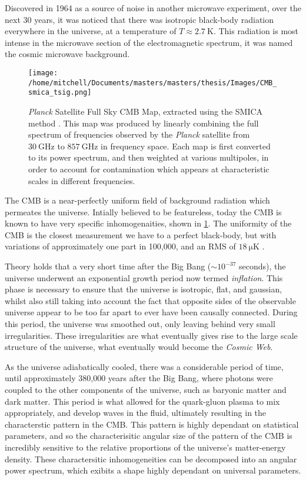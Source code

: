 \par Discovered in 1964 \citep{Penzias:65} as a source of noise in another microwave experiment, over the next 30 years, it was noticed that there was isotropic black-body radiation everywhere in the universe, at a temperature of $T \approx \SI{2.7}{\kelvin}$. This radiation is most intense in the microwave section of the electromagnetic spectrum, it was named the cosmic microwave background.
\begin{figure}[ht]
	\centering
	\texttt{[image: /home/mitchell/Documents/masters/masters/thesis/Images/CMB\_smica\_tsig.png]}
	\label{CMB Map}
	\caption{\emph{Planck} Satellite Full Sky CMB Map, extracted using the SMICA method \citep{2018arXiv180706205P}. This  map was produced by linearly combining the full spectrum of frequencies observed by the \emph{Planck} satellite from $\SI{30}{\giga\hertz}$ to $\SI{857}{\giga\hertz}$ in frequency space. Each map is first converted to its power spectrum, and then weighted at various multipoles, in order to account for contamination which appears at characteristic scales in different frequencies.}
\end{figure}

The CMB is a near-perfectly uniform field of background radiation which permeates the universe. Intially believed to be featureless, today the CMB is known to have very specific inhomogenaities, shown in \ref{CMB Map}. The uniformity of the CMB is the closest measurement we have to a perfect black-body, but with variations of approximately one part in 100,000, and an RMS of $\SI{18}{\micro\kelvin}$ \citep{2004mmu..symp..291W}. 

Theory holds that a very short time after the Big Bang ($\sim 10^{-37}$ seconds), the universe underwent an exponential growth period now termed \textit{inflation}. This phase is necessary to ensure that the universe is isotropic, flat, and gaussian, whilst also still taking into account the fact that opposite sides of the observable universe appear to be too far apart to ever have been causally connected. During this period, the universe was smoothed out, only leaving behind very small irregularities. These irregularities are what eventually gives rise to the large scale structure of the universe, what eventually would become the \emph{Cosmic Web}. 

As the universe adiabatically cooled, there was a considerable period of time, until approximately 380,000 years after the Big Bang, where photons were coupled to the other components of the universe, such as baryonic matter and dark matter. This period is what allowed for the quark-gluon plasma to mix appropriately, and develop waves in the fluid, ultimately resulting in the characterstic pattern in the CMB. This pattern is highly dependant on statistical parameters, and so the characterisitic angular size of the pattern of the CMB is incredibly sensitive to the relative proportions of the universe's matter-energy density. These charactersitic inhomogeneities can be decomposed into an angular power spectrum, which exibits a shape highly dependant on universal parameters. 

